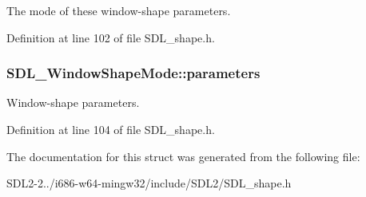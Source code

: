 The mode of these window-\/shape parameters. 



Definition at line 102 of file S\+D\+L\+\_\+shape.\+h.

\hypertarget{structSDL__WindowShapeMode_a2f79bb294034156207fa6d88d3a8c819}{
\subsubsection[{parameters}]{ S\+D\+L\+\_\+\+Window\+Shape\+Mode\+::parameters}}\label{structSDL__WindowShapeMode_a2f79bb294034156207fa6d88d3a8c819}


Window-\/shape parameters. 



Definition at line 104 of file S\+D\+L\+\_\+shape.\+h.



The documentation for this struct was generated from the following file\+:\begin{DoxyCompactItemize}
\item 
S\+D\+L2-\/2../i686-\/w64-\/mingw32/include/\+S\+D\+L2/S\+D\+L\+\_\+shape.\+h\end{DoxyCompactItemize}
